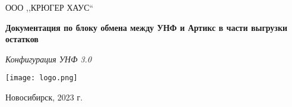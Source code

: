 \begin{titlepage}
\begin{center}
\large
ООО ,,КРЮГЕР ХАУС``


\vspace{2.25cm}

\textbf{Документация по блоку обмена между УНФ и Артикс
		в части выгрузки остатков} 

\textit{Конфигурация УНФ 3.0}
\vfill    

{\texttt{[image: logo.png]}}  

\end{center}
\vfill

\newlength{\ML}


\begin{center}
Новосибирск, 2023 г.
\end{center}
\end{titlepage}